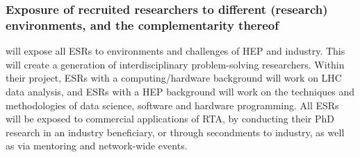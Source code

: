 
\vspace{-2mm}
\subsubsection{Exposure of recruited researchers to different (research) environments, and the complementarity thereof}
\label{sec:exposureComplementarity}

\acronym will expose all ESRs to environments and challenges of HEP and industry. This will create a generation of interdisciplinary problem-solving researchers.
Within their project, ESRs with a computing/hardware background will work on LHC data analysis, and ESRs with a HEP background will work on the techniques and methodologies of data science, software and hardware programming.
All ESRs will be exposed to commercial applications of RTA, by conducting their PhD research in an industry beneficiary, or through secondments to industry, as well as via mentoring and network-wide events. 


